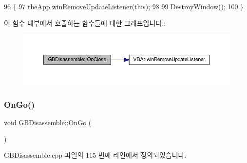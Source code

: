 \begin{DoxyCode}
96 \{
97   \mbox{\hyperlink{_v_b_a_8cpp_a8095a9d06b37a7efe3723f3218ad8fb3}{theApp}}.\mbox{\hyperlink{class_v_b_a_a2d31a0656df2230310aa8dc9e3a735d3}{winRemoveUpdateListener}}(\textcolor{keyword}{this});
98   
99   DestroyWindow();
100 \}
\end{DoxyCode}
이 함수 내부에서 호출하는 함수들에 대한 그래프입니다.\+:
\nopagebreak
\begin{figure}[H]
\begin{center}
\leavevmode
\includegraphics[width=350pt]{class_g_b_disassemble_a2cbf8f743dec4f14119762d81f77ad60_cgraph}
\end{center}
\end{figure}
\mbox{\label{class_g_b_disassemble_a567143c841e67475b78afe7aca95f520}} 
\subsubsection{\texorpdfstring{On\+Go()}{OnGo()}}
{\footnotesize\ttfamily void G\+B\+Disassemble\+::\+On\+Go (\begin{DoxyParamCaption}{ }\end{DoxyParamCaption})\hspace{0.3cm}{\ttfamily [protected]}}



G\+B\+Disassemble.\+cpp 파일의 115 번째 라인에서 정의되었습니다.



